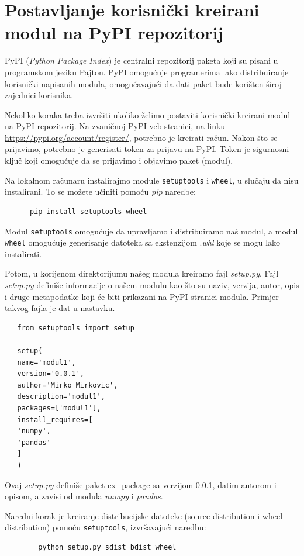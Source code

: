 \section{Postavljanje korisnički kreirani modul  na PyPI repozitorij}

PyPI (\textit{Python Package Index}) je centralni repozitorij paketa   koji su pisani u programskom jeziku Pajton. PyPI omogućuje programerima lako distribuiranje korisnički napisanih modula,  omogućavajući da dati paket bude korišten široj zajednici korisnika.
 
Nekoliko   koraka   treba izvršiti ukoliko želimo postaviti   korisnički kreirani modul na PyPI repozitorij. Na zvaničnoj PyPI veb stranici, na linku  \url{https://pypi.org/account/register/},  potrebno je kreirati račun. Nakon što se prijavimo, potrebno je  generisati token za prijavu na PyPI. Token je sigurnosni ključ koji omogućuje da se prijavimo i objavimo  paket (modul). 
 
 
 Na lokalnom računaru instalirajmo module  \texttt{setuptools} i \texttt{wheel}, u slučaju da nisu instalirani. To se možete učiniti pomoću \textit{pip} naredbe:
 \begin{verbatim}
      pip install setuptools wheel
 \end{verbatim}

Modul \texttt{setuptools} omogućuje da upravljamo i distribuiramo naš modul, a modul \texttt{wheel}   omogućuje generisanje datoteka sa ekstenzijom .\textit{whl} koje se mogu lako instalirati.

Potom,  u korijenom direktorijumu našeg modula  kreiramo fajl \textit{setup.py}. Fajl \textit{setup.py}  definiše informacije o našem modulu kao što su naziv, verzija, autor, opis i druge metapodatke koji će biti prikazani na PyPI stranici   modula. Primjer takvog fajla je dat u nastavku.

\begin{verbatim}
   from setuptools import setup
   
   setup(
   name='modul1',
   version='0.0.1',
   author='Mirko Mirkovic',
   description='modul1',
   packages=['modul1'],
   install_requires=[
   'numpy',
   'pandas'
   ]
   )
\end{verbatim}
Ovaj \textit{ setup.py}   definiše paket ex\_package sa verzijom 0.0.1, datim autorom  i opisom, a zavisi od modula \textit{numpy} i \textit{pandas}.

Naredni korak je kreiranje distribucijske datoteke (source distribution i wheel distribution) pomoću \texttt{setuptools}, izvršavajući naredbu:
\begin{verbatim}
        python setup.py sdist bdist_wheel
\end{verbatim}
 
